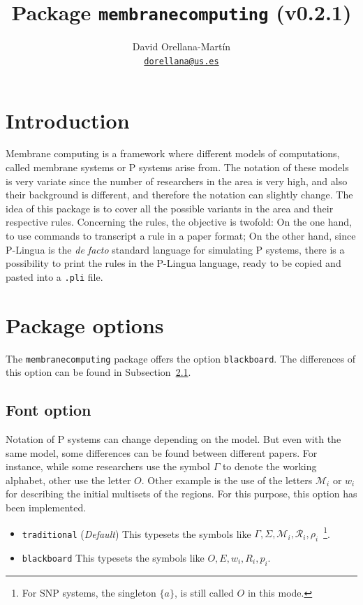 \documentclass{article}
\title{Package \texttt{membranecomputing} (v0.2.1)}
\author{David Orellana-Martín \\ \texttt{\href{mailto:dorellana@us.es}{dorellana@us.es}}}
\begin{document}
\maketitle

\tableofcontents

\section{Introduction}
\label{sec:introduction}

Membrane computing is a framework where different models of
computations, called membrane systems or P systems arise from. The
notation of these models is very variate since the number of
researchers in the area is very high, and also their background is
different, and therefore the notation can slightly change. The idea of
this package is to cover all the possible variants in the area and
their respective rules. Concerning the rules, the objective is
twofold: On the one hand, to use commands to transcript a rule in a
paper format; On the other hand, since P-Lingua is the \textit{de
  facto} standard language for simulating P systems, there is a
possibility to print the rules in the P-Lingua language, ready to be
copied and pasted into a \texttt{.pli} file.

\section{Package options}
\label{sec:package-options}

The \texttt{membranecomputing} package offers the option
\texttt{blackboard}. The differences of this option can be found in
Subsection~\ref{sec:font-option}.

\subsection{Font option}
\label{sec:font-option}

Notation of P systems can change depending on the model. But even with
the same model, some differences can be found between different
papers. For instance, while some researchers use the symbol $\Gamma$
to denote the working alphabet, other use the letter $O$. Other
example is the use of the letters $\mathcal{M}_{i}$ or $w_{i}$ for
describing the initial multisets of the regions. For this purpose,
this option has been implemented.

\begin{itemize}
\item \texttt{traditional} (\textit{Default}) This typesets the
  symbols like
  $\Gamma, \Sigma, \mathcal{M}_{i}, \mathcal{R}_{i},
  \rho_{i}$~\footnote{For SNP systems, the singleton $\{a\}$, is still
    called $O$ in this mode.}.
\item \texttt{blackboard} This typesets the symbols like
  $O, E, w_{i}, R_{i}, p_{i}$.
\end{itemize}
\end{document}

